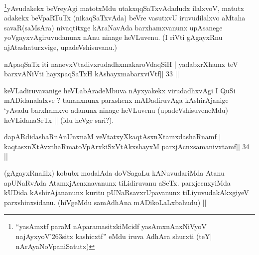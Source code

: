 \begin{artha}
\footnote[3]{``yasAmxtf paraM nAparamasitxkiMcidf yasAmxnAnxNiVyoV 
najAyxyoV\char'263sitx kashicxtf'' eMdu iruva AdhAra shurxti (teY| 
nArAyaNoVpaniSatutx)}yAvudakekx beVreyAgi matotxMdu utakxqqSaTxvAdadudx ilalxvoV, matutx adakekx beVpaRTuTx (nikaqSaTxvAda) beVre vasutxvU iruvudilalxvo aMtaha savaR(saMsAra) nivaqtitxge kAraNavAda barxhamxvanunx upAsanege yoVgayxvAgiruvudanunx nAnu ninage heVLuvenu. (I riVti gAgayxRnu ajAtashaturxvige, upadeVshisuvanu.)
\end{artha}


\begin{shl}
\footnotemark[4]nApaqSaTx iti nanevxVtadivxrudadhxmakaroVdaqSiH |
yadabxrXhamx teV barxvANiVti hayxpaqSaTxH kAshayxmabarxviVtf\hfill || 33 ||
\end{shl}

\begin{artha}
keVLadiruvavanige heVLabAradeMbuva nAyxyakekx virudadhxvAgi I QuSi mADidanalalxve ? tananxnunx parxshenx mADadiruvAga kAshirAjanige `yAvadu barxhamxvo adanunx ninage heVLuvenu (upadeVshisuveneMdu) heVLidanaSeTx || (idu heVge sari?).
\end{artha}


\begin{shl}
dapARdidashaRnAnUnxnaM veVtatxyXkaqtAsxnXtamxdashaRnamf |
kaqtasxnXtAvxthaRmatoV\s pArxkiSxVtAkxshayxM parxjAcnxsamanivxtamf\hfill || 34 ||
\end{shl}

\begin{artha}
(gAgayxRnalilx) kobubx modalAda doVSagaLu kANuvudariMda Atanu apUNaRvAda AtamxjAcnxnavanunx tiLidiruvanu aSeTx. parxjecnxyiMda kUDida kAshirAjananunx kuritu pUNaRsavxrUpavanunx tiLiyuvudakAkxgiyeV parxshinxsidanu. (hiVgeMdu samAdhAna mADikoLaLxbahudu) || 
\end{artha}


